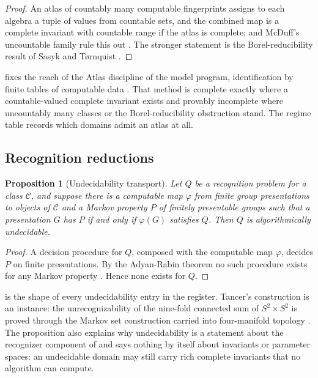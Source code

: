 \documentclass[11pt,letterpaper]{article}
\newtheorem{proposition}[theorem]{Proposition}
\theoremstyle{definition}
\theoremstyle{remark}
\begin{document}
\begin{proof}
An atlas of countably many computable fingerprints assigns to each algebra a tuple of values from countable sets, and the combined map is a complete invariant with countable range if the atlas is complete;  and McDuff's uncountable family rule this out \cite{mcduff1969}. The stronger statement is the Borel-reducibility result of Sasyk and Tørnquist \cite{sasyk2009}.
\end{proof}

 fixes the reach of the Atlas discipline of the model program, identification by finite tables of computable data \cite{atlaswiki}. That method is complete exactly where a countable-valued complete invariant exists and provably incomplete where uncountably many classes or the Borel-reducibility obstruction stand. The regime table records which domains admit an atlas at all.

\subsection{Recognition reductions}

\begin{proposition}[Undecidability transport]
\label{prop:undec}
Let $Q$ be a recognition problem for a class $\mathcal{C}$, and suppose there is a computable map $\varphi$ from finite group presentations to objects of $\mathcal{C}$ and a Markov property $P$ of finitely presentable groups such that a presentation $G$ has $P$ if and only if $\varphi(G)$ satisfies $Q$. Then $Q$ is algorithmically undecidable.
\end{proposition}

\begin{proof}
A decision procedure for $Q$, composed with the computable map $\varphi$, decides $P$ on finite presentations. By the Adyan-Rabin theorem no such procedure exists for any Markov property \cite{adyan1955,rabin1958}. Hence none exists for $Q$.
\end{proof}

 is the shape of every undecidability entry in the register. Tancer's construction is an instance: the unrecognizability of the nine-fold connected sum of $S^2 \times S^2$ is proved through the Markov set construction carried into four-manifold topology \cite{tancer2023}. The proposition also explains why undecidability is a statement about the recognizer component of  and says nothing by itself about invariants or parameter spaces: an undecidable domain may still carry rich complete invariants that no algorithm can compute.
\end{document}
